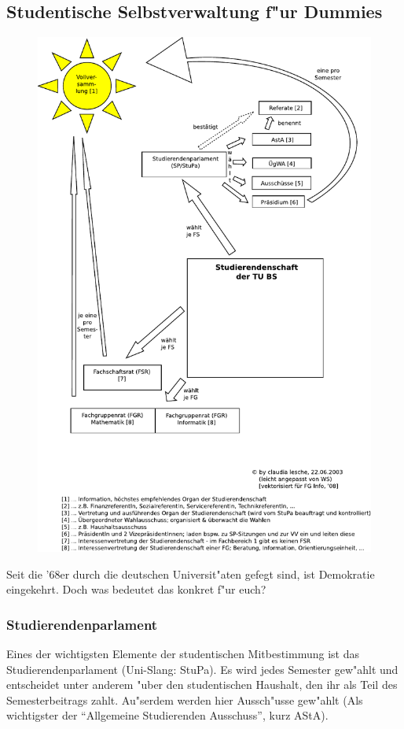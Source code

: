 \subsection{Studentische Selbstverwaltung f"ur Dummies}

\begin{figure}[b]
  \centering
  \includegraphics[width=\textwidth]{bilder/gremienkunde.pdf}
\end{figure}

Seit die '68er durch die deutschen Universit"aten gefegt sind, 
ist Demokratie eingekehrt.
Doch was bedeutet das konkret f"ur euch?

\subsubsection*{Studierendenparlament}
Eines der wichtigsten Elemente der studentischen Mitbestimmung 
ist das Studierendenparlament (Uni-Slang: StuPa).
Es wird jedes Semester gew"ahlt und entscheidet unter anderem 
"uber den studentischen Haushalt, den ihr als Teil des Semesterbeitrags 
zahlt. Au"serdem werden hier Aussch"usse gew"ahlt (Als wichtigster 
der "`Allgemeine Studierenden Ausschuss"', kurz AStA).

